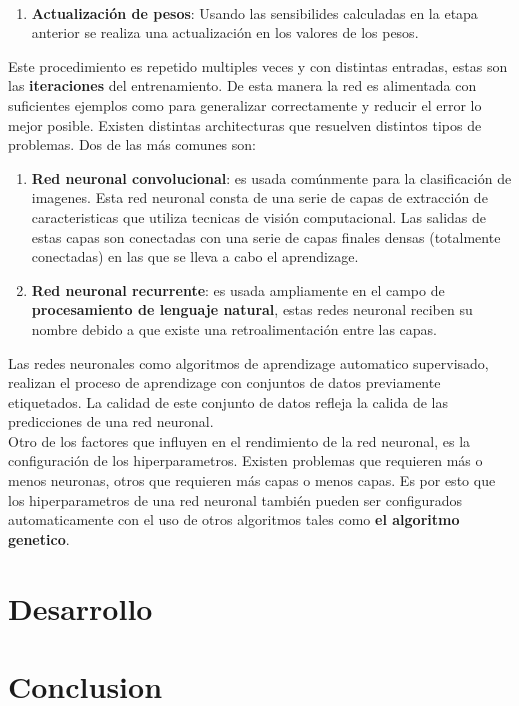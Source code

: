 \documentclass{article}
\begin{document}
$$\begin{enumerate}
    \item \textbf{Actualización de pesos}: Usando las sensibilides calculadas en la etapa anterior se realiza una actualización en los valores de los pesos. 
\end{enumerate}
Este procedimiento es repetido multiples veces y con distintas entradas, estas son las \textbf{iteraciones} del entrenamiento. De esta manera la red es alimentada con suficientes ejemplos como para generalizar correctamente y reducir el error lo mejor posible.
Existen distintas architecturas que resuelven distintos tipos de problemas. Dos de las más comunes son:
\begin{enumerate}
    \item \textbf{Red neuronal convolucional}: es usada comúnmente para la clasificación de imagenes. Esta red neuronal consta de una serie de capas de extracción de caracteristicas que utiliza tecnicas de visión computacional. Las salidas de estas capas son conectadas con una serie de capas finales densas (totalmente conectadas) en las que se lleva a cabo el aprendizage.
    \item \textbf{Red neuronal recurrente}: es usada ampliamente en el campo de \textbf{procesamiento de lenguaje natural}, estas redes neuronal reciben su nombre debido a que existe una retroalimentación entre las capas.
\end{enumerate} 
Las redes neuronales como algoritmos de aprendizage automatico supervisado, realizan el proceso de aprendizage con conjuntos de datos previamente etiquetados. La calidad de este conjunto de datos refleja la calida de las predicciones de una red neuronal. \\
Otro de los factores que influyen en el rendimiento de la red neuronal, es la configuración de los hiperparametros. Existen problemas que requieren más o menos neuronas, otros que requieren más capas o menos capas. Es por esto que los hiperparametros de una red neuronal también pueden ser configurados automaticamente con el uso de otros algoritmos tales como \textbf{el algoritmo genetico}.




\section{Desarrollo}\label{sec:Desarrollo}
\section{Conclusion}\label{sec:Conclusion}
\end{document}
